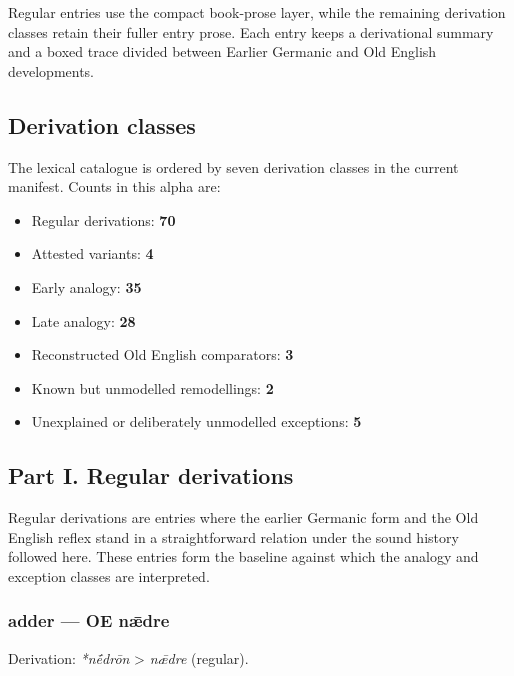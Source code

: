 \documentclass[
  british,
  a4paper,
]{article}
\providecommand{\tightlist}{%
  \setlength{\itemsep}{0pt}\setlength{\parskip}{0pt}}
\begin{document}
Regular entries use the compact book-prose layer, while the remaining
derivation classes retain their fuller entry prose. Each entry keeps a
derivational summary and a boxed trace divided between Earlier Germanic
and Old English developments.

\subsection{Derivation classes}\label{derivation-classes}

The lexical catalogue is ordered by seven derivation classes in the
current manifest. Counts in this alpha are:

\begin{itemize}
\tightlist
\item
  Regular derivations: \textbf{70}
\item
  Attested variants: \textbf{4}
\item
  Early analogy: \textbf{35}
\item
  Late analogy: \textbf{28}
\item
  Reconstructed Old English comparators: \textbf{3}
\item
  Known but unmodelled remodellings: \textbf{2}
\item
  Unexplained or deliberately unmodelled exceptions: \textbf{5}
\end{itemize}

\clearpage

\subsection{Part I. Regular
derivations}\label{part-i.-regular-derivations}

Regular derivations are entries where the earlier Germanic form and the
Old English reflex stand in a straightforward relation under the sound
history followed here. These entries form the baseline against which the
analogy and exception classes are interpreted.

\subsubsection{adder --- OE nǣdre}\label{adder-oe-nux1e3dre}

Derivation: \emph{*nḗdrōn} \textgreater{} \emph{nǣdre} (regular).

\begingroup
\setlength{\fboxsep}{6pt}
\end{document}
